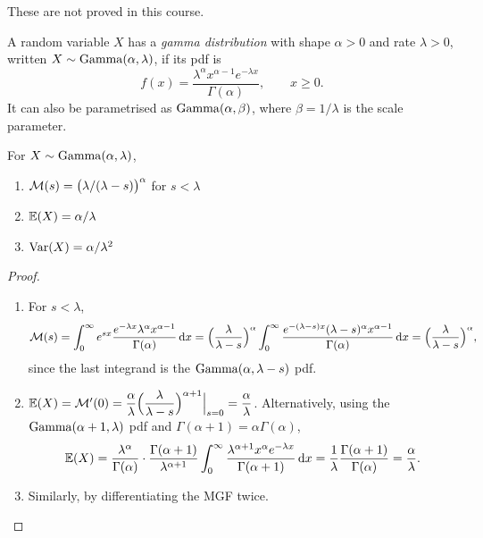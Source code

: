 These are not proved in this course.

\begin{definition}\label{def:gamma-distribution}
A random variable $X$ has a \emph{gamma distribution} with shape $\alpha > 0$ and rate $\lambda > 0$, written $X \sim \mathrm{Gamma}(\alpha, \lambda)$, if its pdf is
\[
  f(x) = \frac{\lambda^\alpha x^{\alpha - 1} e^{-\lambda x}}{\Gamma(\alpha)}, \qquad x \ge 0.
\]
It can also be parametrised as $\mathrm{Gamma}(\alpha, \beta)$, where $\beta = 1/\lambda$ is the scale parameter.
\end{definition}

\begin{theorem}\label{thm:gamma-properties}
For $X \sim \mathrm{Gamma}(\alpha, \lambda)$,
\begin{enumerate}
  \item $\mathcal{M}(s) = \bigl(\lambda/(\lambda - s)\bigr)^\alpha$ for $s < \lambda$
  \item $\operatorname{\mathbb{E}}(X) = \alpha/\lambda$
  \item $\operatorname{Var}(X) = \alpha/\lambda^2$
\end{enumerate}
\end{theorem}

\begin{proof}\leavevmode
\begin{enumerate}[leftmargin=*]
  \item[1.] For $s < \lambda$,
\[
  \mathcal{M}(s) = \int_0^\infty e^{sx} \frac{e^{-\lambda x} \lambda^\alpha x^{\alpha - 1}}{\Gamma(\alpha)} \mathop{}\!\mathrm{d} x = \Bigl(\frac{\lambda}{\lambda - s}\Bigr)^\alpha \int_0^\infty \frac{e^{-(\lambda - s)x} (\lambda - s)^\alpha x^{\alpha - 1}}{\Gamma(\alpha)} \mathop{}\!\mathrm{d} x = \Bigl(\frac{\lambda}{\lambda - s}\Bigr)^\alpha,
\]
since the last integrand is the $\mathrm{Gamma}(\alpha, \lambda - s)$ pdf.
  \item[2.] $\operatorname{\mathbb{E}}(X) = \mathcal{M}'(0) = \dfrac{\alpha}{\lambda} \Bigl(\dfrac{\lambda}{\lambda - s}\Bigr)^{\alpha + 1}\Big|_{s=0} = \dfrac{\alpha}{\lambda}$. Alternatively, using the $\mathrm{Gamma}(\alpha + 1, \lambda)$ pdf and $\Gamma(\alpha+1) = \alpha\Gamma(\alpha)$,
\[
  \operatorname{\mathbb{E}}(X) = \frac{\lambda^\alpha}{\Gamma(\alpha)} \cdot \frac{\Gamma(\alpha + 1)}{\lambda^{\alpha + 1}} \int_0^\infty \frac{\lambda^{\alpha + 1} x^\alpha e^{-\lambda x}}{\Gamma(\alpha + 1)} \mathop{}\!\mathrm{d} x = \frac{1}{\lambda} \frac{\Gamma(\alpha + 1)}{\Gamma(\alpha)} = \frac{\alpha}{\lambda}.
\]
  \item[3.] Similarly, by differentiating the MGF twice. \qedhere
\end{enumerate}
\end{proof}

